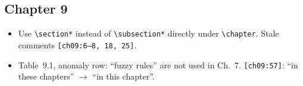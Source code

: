 \documentclass[10pt,a4paper]{article}
\newcommand{\src}[1]{{\footnotesize\texttt{[#1]}}}
\begin{document}
\subsection*{Chapter 9}
\begin{itemize}
\item Use \verb|\section*| instead of \verb|\subsection*| directly under \verb|\chapter|. Stale comments \src{ch09:6--8, 18, 25}.
\item Table~9.1, anomaly row: ``fuzzy rules'' are not used in Ch.~7. \src{ch09:57}: ``in these chapters'' $\to$ ``in this chapter''.
\end{itemize}
\end{document}
